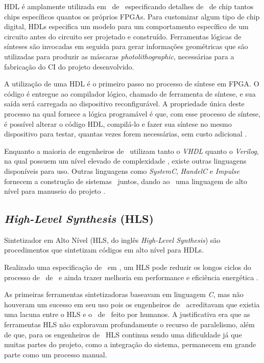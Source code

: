 		HDL é amplamente utilizada em \design\ de \hardware\ especificando detalhes de \design\ de chip tantos chips específicos quantos os próprios FPGAs.
      Para customizar algum tipo de chip digital, HDLs especifica um modelo para um comportamento específico de um circuito antes do circuito ser projetado e construído.
      Ferramentas lógicas de sínteses são invocadas em seguida para gerar informações geométricas que são utilizadas para produzir as máscaras \textit{photolithographic}, necessárias para a fabricação do CI do projeto desenvolvido.

		A utilização de uma HDL é o primeiro passo no processo de síntese em FPGA.
      O código é entregue ao compilador lógico, chamado de ferramenta de síntese, e sua saída será carregada ao dispositivo reconfigurável.
		A propriedade única deste processo na qual fornece a lógica programável é que, com esse processo de síntese, é possível alterar o código HDL, compilá-lo e fazer sua síntese no mesmo dispositivo para testar, quantas vezes forem necessárias, sem custo adicional \citep{Smith1998}.

		Enquanto a maioria de engenheiros de \hardware\ utilizam tanto o \textit{VHDL} quanto o \textit{Verilog}, na qual possuem um nível elevado de complexidade \citep{Choi2016}, existe outras linguagens disponíveis para uso.
      Outras linguagens como \textit{SystemC}, \textit{HandelC} e \textit{Impulse} fornecem a construção de sistemas \hs\ juntos, dando ao \designer\ uma linguagem de alto nível para manuseio do projeto \citep{Sass2010}.


	\subsection{\textit{High-Level Synthesis} (HLS)}
		Sintetizador em Alto Nível (HLS, do inglês \textit{High-Level Synthesis}) são procedimentos que sintetizam códigos em alto nível para HDLs.

		Realizado uma especificação de \design\ em \software, um HLS pode reduzir os longos ciclos do processo de \design\ de \hardware\ e ainda trazer melhoria em performance e eficiência energética \citep{Choi2016}.

		As primeiras ferramentas sintetizadoras baseavam em linguagem \textit{C}, mas não houveram um sucesso em seu uso pois os engenheiros de \hardware\ acreditavam que existia uma lacuna entre o HLS e o \design\ de \hardware\ feito por humanos.
      A justificativa era que as ferramentas HLS não exploravam profundamente o recurso de paralelismo, além de que, para os engenheiros de \software\ HLS continua sendo uma dificuldade já que muitas partes do projeto, como a integração do sistema, permanecem em grande parte como um processo manual.

